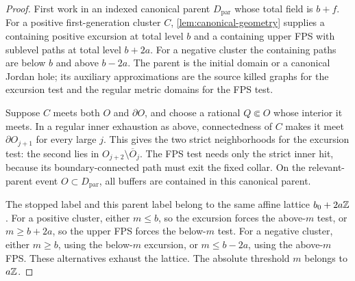 \begin{proof}
First work in an indexed canonical parent \(D_{\mathrm{par}}\) whose
total field is \(b+f\).
For a positive first-generation cluster \(C\),
\cref{lem:canonical-geometry} supplies a containing positive excursion
at total level \(b\) and a containing upper FPS with sublevel paths at
total level \(b+2a\). For a negative cluster the containing paths are
below \(b\) and above \(b-2a\). The parent is the initial domain or a
canonical Jordan hole; its auxiliary approximations are the source killed graphs for the
excursion test and the regular metric domains for the FPS test.

Suppose \(C\) meets both \(O\) and \(\partial O\), and choose a rational
\(Q\Subset O\) whose interior it meets. In a regular inner exhaustion
as above, connectedness of \(C\) makes it meet \(\partial O_{j+1}\)
for every large \(j\). This gives the two strict neighborhoods for the
excursion test: the second lies in
\(O_{j+2}\setminus\overline O_j\). The FPS test needs only the strict
inner hit, because its boundary-connected path must exit the fixed
collar. On the relevant-parent event \(O\subset D_{\mathrm{par}}\),
all buffers are contained in this canonical parent.

The stopped label and this parent label belong to the same affine
lattice \(b_0+2a\mathbb Z\). For a positive cluster, either \(m\le b\), so
the excursion forces the above-\(m\) test, or \(m\ge b+2a\), so the
upper FPS forces the below-\(m\) test. For a negative cluster, either
\(m\ge b\), using the below-\(m\) excursion, or \(m\le b-2a\), using
the above-\(m\) FPS. These alternatives exhaust the lattice. The
absolute threshold \(m\) belongs to \(a\mathbb Z\).


\end{proof}
